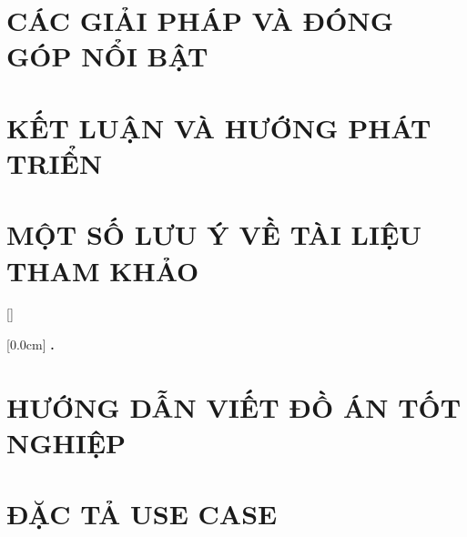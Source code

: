 \documentclass[a4paper,13pt,3p,twoside]{report}
\renewcommand{\bibname}{Danh_sach_tai_lieu_tham_khao}
\theoremstyle{definition}
\begin{document}
\chapter{CÁC GIẢI PHÁP VÀ ĐÓNG GÓP NỔI BẬT}
\label{chapter:SolutionAndContribution}

\newpage
\chapter{KẾT LUẬN VÀ HƯỚNG PHÁT TRIỂN} %
\label{chapter:conclusion}


\newpage
\chapter*{MỘT SỐ LƯU Ý VỀ TÀI LIỆU THAM KHẢO} %
\label{chapter:reference}



\newpage
\renewcommand\bibname{TÀI LIỆU THAM KHẢO}
\printbibliography
{}

\appendixpage
\appendices
\addappheadtotoc


{}[]
\titlespacing*{\chapter}{0pt}{-20pt}{20pt}

    [0.0cm]             %
    {\bfseries\vspace{0.3cm}}                  %
    {{\bfseries{\scshape} \thecontentslabel.\ }} %
    {}         %
    {\contentspage}         %
\chapter{HƯỚNG DẪN VIẾT ĐỒ ÁN TỐT NGHIỆP}

\newpage
\chapter{ĐẶC TẢ USE CASE}

\end{document}
